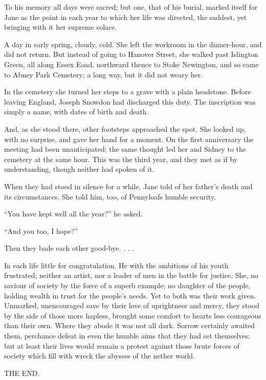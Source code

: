 To his memory all days were sacred; but one, that of his burial, marked
itself for Jane as the point in each year to which her life was
directed, the saddest, yet bringing with it her supreme solace.

A day in early spring, cloudy, cold. She left the workroom in the
dinner-hour, and did not return. But instead of going to Hanover Street,
she walked past Islington Green, all {} along Essex Eoad, northward
thence to Stoke Newington, and so came to Abney Park Cemetery; a long
way, but it did not weary her.

In the cemetery she turned her steps to a grave with a plain headstone.
Before leaving England, Joseph Snowdon had discharged this duty. The
inscription was simply a name, with dates of birth and death.

And, as she stood there, other footsteps approached the spot. She looked
up, with no surprise, and gave her hand for a moment. On the first
anniversary the meeting had been unanticipated; the same thought led her
and Sidney to the cemetery at the same hour. This was the third year,
and they met as if by understanding, though neither had spoken of it.

When they had stood in silence for a while, Jane told of her father's
death and its circumstances. She told him, too, of Pennyloafs humble
security.

``You have kept well all the year?'' he asked.

``And you too, I hope?''

Then they bade each other good-bye. . . .

In each life little for congratulation. He {}with the ambitions of his
youth frustrated; neither an artist, nor a leader of men in the battle
for justice. She, no saviour of society by the force of a superb
example; no daughter of the people, holding wealth in trust for the
people's needs. Yet to both was their work given. Unmarked, unencouraged
save by their love of uprightness and mercy, they stood by the side of
those more hapless, brought some comfort to hearts less courageous than
their own. Where they abode it was not all dark. Sorrow certainly
awaited them, perchance defeat in even the humble aims that they had set
themselves; but at least their lives would remain a protest against
those brute forces of society which fill with wreck the abysses of the
nether world.

\vfill
\begin{center}
THE END.
\end{center}
